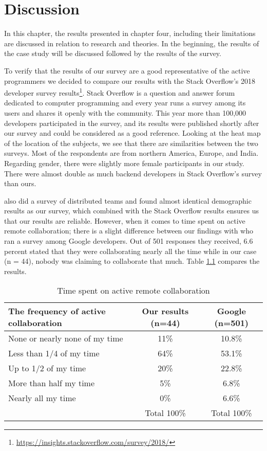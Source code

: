 \chapter{Discussion}

In this chapter, the results presented in chapter four, including their limitations are discussed in relation to research and theories. In the beginning, the results of the case study will be discussed followed by the results of the survey.

To verify that the results of our survey are a good representative of the active programmers we decided to compare our results with the Stack Overflow’s 2018 developer survey results\footnote{\url{https://insights.stackoverflow.com/survey/2018/}}. Stack Overflow is a question and answer forum dedicated to computer programming and every year runs a survey among its users and shares it openly with the community. This year more than 100,000 developers participated in the survey, and its results were published shortly after our survey and could be considered as a good reference. 
Looking at the heat map of the location of the subjects, we see that there are similarities between the two surveys. Most of the respondents are from northern America, Europe, and India. Regarding gender, there were slightly more female participants in our study. There were almost double as much backend developers in Stack Overflow’s survey than ours. 

\citet{Stray2017a} also did a survey of distributed teams and found almost identical demographic results as our survey, which combined with the Stack Overflow results ensures us that our results are reliable. 
However, when it comes to time spent on active remote collaboration; there is a slight difference between our findings with \citet{Karis2016} who ran a survey among Google developers. Out of 501 responses they received, 6.6 percent stated that they were collaborating nearly all the time while in our case (n = 44), nobody was claiming to collaborate that much. Table \ref{table:collaboration} compares the results.
    
    
\begin{table}
\centering
\caption{Time spent on active remote collaboration} \label{table:collaboration}
\begin{tabular}{lcc}
\hline
\textbf{The frequency of active collaboration} & \textbf{Our results (n=44)} & \textbf{Google (n=501)} \\ \hline
None or nearly none of my time&11\%&10.8\%\\
Less than 1/4 of my time&64\%&53.1\%\\
Up to 1/2 of my time&20\%&22.8\%\\
More than half my time&5\%&6.8\%\\
Nearly all my time&0\%&6.6\%\\
&Total 100\%&Total 100\%\\
\hline
\end{tabular}
\end{table}

